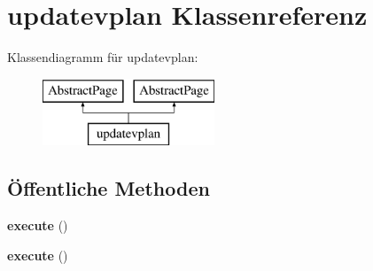 \hypertarget{classupdatevplan}{}\section{updatevplan Klassenreferenz}
\label{classupdatevplan}
Klassendiagramm für updatevplan\+:\begin{figure}[H]
\begin{center}
\leavevmode
\includegraphics[height=2.000000cm]{classupdatevplan}
\end{center}
\end{figure}
\subsection*{Öffentliche Methoden}
\begin{DoxyCompactItemize}
\item 
\mbox{\label{classupdatevplan_a043f62657d8dcb2ee3800c09ecdeca2a}} 
{\bfseries execute} ()
\item 
\mbox{\label{classupdatevplan_a043f62657d8dcb2ee3800c09ecdeca2a}} 
{\bfseries execute} ()
\end{DoxyCompactItemize}
